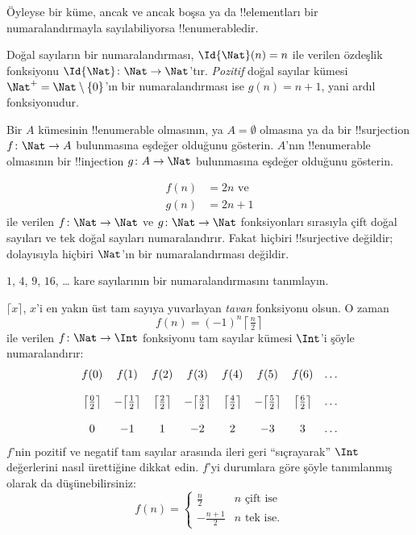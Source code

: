 \documentclass[../../../include/open-logic-section]{subfiles}
\begin{document}
\begin{explain}
Öyleyse bir küme, ancak ve ancak boşsa ya da !!{element}ları bir
numaralandırmayla sayılabiliyorsa !!{enumerable}dir.
\end{explain}

\begin{ex}
Doğal sayıların bir numaralandırması, $\Id{\Nat}(n)=n$ ile verilen özdeşlik
fonksiyonu $\Id{\Nat}\colon\Nat\to\Nat$'tır. \emph{Pozitif} doğal sayılar
kümesi $\Nat^+=\Nat\setminus\{0\}$'ın bir numaralandırması ise $g(n)=n+1$,
yani ardıl fonksiyonudur.
\end{ex}

\begin{prob}
Bir $A$ kümesinin !!{enumerable} olmasının, ya $A=\emptyset$ olmasına ya da
bir !!{surjection} $f\colon\Nat\to A$ bulunmasına eşdeğer olduğunu gösterin.
$A$'nın !!{enumerable} olmasının bir !!{injection} $g\colon A\to\Nat$
bulunmasına eşdeğer olduğunu gösterin.
\end{prob}

\begin{ex}
\begin{align*}
  f(n) & = 2n \text{ ve}\\
  g(n) & = 2n+1
\end{align*}
ile verilen $f\colon\Nat\to\Nat$ ve $g\colon\Nat\to\Nat$ fonksiyonları
sırasıyla çift doğal sayıları ve tek doğal sayıları numaralandırır. Fakat
hiçbiri !!{surjective} değildir; dolayısıyla hiçbiri $\Nat$'ın bir
numaralandırması değildir.
\end{ex}

\begin{prob}
$1$, $4$, $9$, $16$, \dots{} kare sayılarının bir numaralandırmasını
tanımlayın.
\end{prob}

\begin{ex}
$\lceil x\rceil$, $x$'i en yakın üst tam sayıya yuvarlayan \emph{tavan}
fonksiyonu olsun. O zaman
\[
  f(n) = (-1)^{n} \left\lceil\tfrac{n}{2}\right\rceil
\]
ile verilen $f\colon\Nat\to\Int$ fonksiyonu tam sayılar kümesi $\Int$'i
şöyle numaralandırır:
\[
\begin{array}{c c c c c c c c}
f(0) & f(1) & f(2) & f(3) & f(4) & f(5) & f(6) & \dots \\ \\
\big\lceil \tfrac{0}{2} \big\rceil & -\big\lceil \tfrac{1}{2}\big\rceil &  \big\lceil \tfrac{2}{2} \big\rceil & -\big\lceil \tfrac{3}{2} \big\rceil & \big\lceil \tfrac{4}{2} \big\rceil  & -\big\lceil \tfrac{5}{2}\big\rceil & \big\lceil \tfrac{6}{2} \big\rceil & \dots \\ \\
0 & -1 & 1 & -2 & 2 & -3 & 3& \dots
\end{array}
\]
$f$'nin pozitif ve negatif tam sayılar arasında ileri geri ``sıçrayarak''
$\Int$ değerlerini nasıl ürettiğine dikkat edin. $f$'yi durumlara göre şöyle
tanımlanmış olarak da düşünebilirsiniz:
\[
f(n) = \begin{cases}
  \frac{n}{2} & \text{$n$ çift ise}\\
  -\frac{n+1}{2} & \text{$n$ tek ise.}
  \end{cases}
\]
\end{ex}
\end{document}
